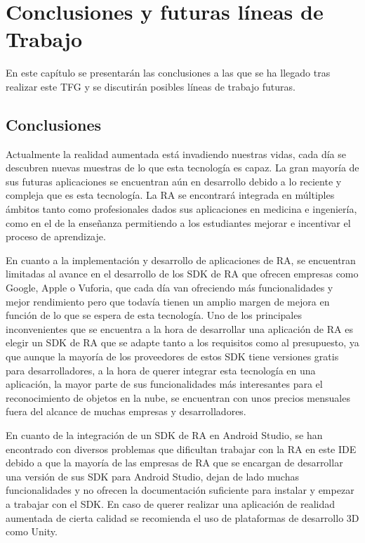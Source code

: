 %
%
%

\chapter{Conclusiones y futuras líneas de Trabajo} \label{chap:Conclusiones} 

En este capítulo se presentarán las conclusiones a las que se ha llegado tras realizar este TFG y se discutirán posibles líneas de trabajo futuras.

\section{Conclusiones}
 
Actualmente la realidad aumentada está invadiendo nuestras vidas, cada día se descubren nuevas muestras de lo que esta tecnología es capaz. La gran mayoría de sus futuras aplicaciones se encuentran aún en desarrollo debido a lo reciente y compleja que es esta tecnología. La RA se encontrará integrada en múltiples ámbitos tanto como profesionales dados sus aplicaciones en medicina e ingeniería, como en el de la enseñanza permitiendo a los estudiantes mejorar e incentivar el proceso de aprendizaje. 

En cuanto a la implementación y desarrollo de aplicaciones de RA, se encuentran limitadas al avance en el desarrollo de los SDK de RA que ofrecen empresas como Google, Apple o Vuforia, que cada día van ofreciendo más funcionalidades y mejor rendimiento pero que todavía tienen un amplio margen de mejora en función de lo que se espera de esta tecnología. Uno de los principales inconvenientes que se encuentra a la hora de desarrollar una aplicación de RA es elegir un SDK de RA que se adapte tanto a los requisitos como al presupuesto, ya que aunque la mayoría de los proveedores de estos SDK tiene versiones gratis para desarrolladores, a la hora de querer integrar esta tecnología en una aplicación,  la mayor parte de sus funcionalidades más interesantes para el reconocimiento de objetos en la nube, se encuentran con unos precios mensuales fuera del alcance de muchas empresas y desarrolladores.

En cuanto de la integración de un SDK de RA en Android Studio, se han encontrado con diversos problemas que dificultan trabajar con la RA en este IDE debido a que la mayoría de las empresas de RA que se encargan de desarrollar una versión de sus SDK para Android Studio, dejan de lado muchas funcionalidades y no ofrecen la documentación suficiente para instalar y empezar a trabajar con el SDK. En caso de querer realizar una aplicación de realidad aumentada de cierta calidad se recomienda el uso de plataformas de desarrollo 3D como Unity.



